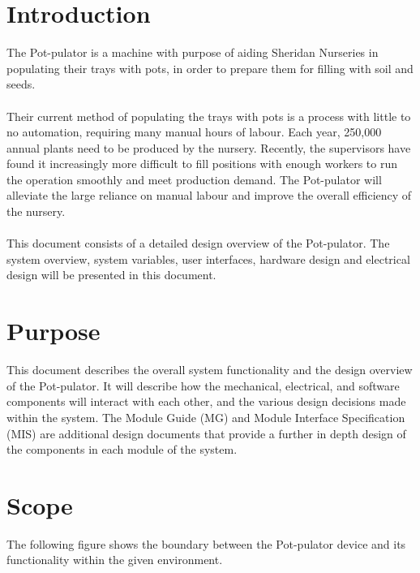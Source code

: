 \documentclass[12pt, titlepage]{article}
\begin{document}
\newpage

\tableofcontents

\newpage

\listoftables

\listoffigures

\newpage


\section{Introduction}

The Pot-pulator is a machine with purpose of aiding Sheridan Nurseries in 
populating their trays with pots, in order to prepare them for filling with 
soil and seeds.\\\\Their current method of populating the trays with pots is a 
process with little to no automation, requiring many manual hours of labour. 
Each year, 250,000 annual plants need to be produced by the nursery. Recently, 
the supervisors have found it increasingly more difficult to fill positions with 
enough workers to run the operation smoothly and meet production demand. 
The Pot-pulator will alleviate the large reliance on manual labour and 
improve the overall efficiency of the nursery. \\\\This document consists of a 
detailed design overview of the Pot-pulator. The system overview, system 
variables, user interfaces, hardware design and electrical design will be 
presented in this document.


\section{Purpose}

This document describes the overall system functionality and the design overview 
of the Pot-pulator. It will describe how the mechanical, electrical, and software 
components will interact with each other, and the various design decisions made 
within the system. The Module Guide (MG) and Module Interface Specification (MIS) 
are additional design documents that provide a further in depth design of the 
components in each module of the system.

\section{Scope}
The following figure shows the boundary between the Pot-pulator device and its functionality
within the given environment.
\end{document}
